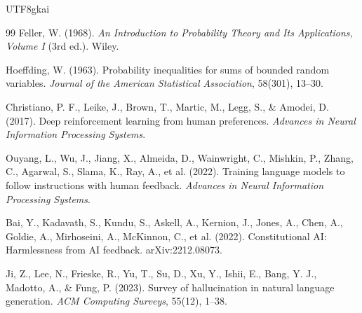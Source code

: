 \documentclass[12pt]{article}
\begin{document}
\begin{CJK*}{UTF8}{gkai}
\begin{thebibliography}{99}
Feller, W. (1968).
\newblock \emph{An Introduction to Probability Theory and Its Applications, Volume I} (3rd ed.).
\newblock Wiley.

Hoeffding, W. (1963).
\newblock Probability inequalities for sums of bounded random variables.
\newblock \emph{Journal of the American Statistical Association}, 58(301), 13--30.

Christiano, P. F., Leike, J., Brown, T., Martic, M., Legg, S., \& Amodei, D. (2017).
\newblock Deep reinforcement learning from human preferences.
\newblock \emph{Advances in Neural Information Processing Systems}.

Ouyang, L., Wu, J., Jiang, X., Almeida, D., Wainwright, C., Mishkin, P., Zhang, C., Agarwal, S., Slama, K., Ray, A., et al. (2022).
\newblock Training language models to follow instructions with human feedback.
\newblock \emph{Advances in Neural Information Processing Systems}.

Bai, Y., Kadavath, S., Kundu, S., Askell, A., Kernion, J., Jones, A., Chen, A., Goldie, A., Mirhoseini, A., McKinnon, C., et al. (2022).
\newblock Constitutional AI: Harmlessness from AI feedback.
\newblock arXiv:2212.08073.

Ji, Z., Lee, N., Frieske, R., Yu, T., Su, D., Xu, Y., Ishii, E., Bang, Y. J., Madotto, A., \& Fung, P. (2023).
\newblock Survey of hallucination in natural language generation.
\newblock \emph{ACM Computing Surveys}, 55(12), 1--38.

\end{thebibliography}

\end{CJK*}
\end{document}

